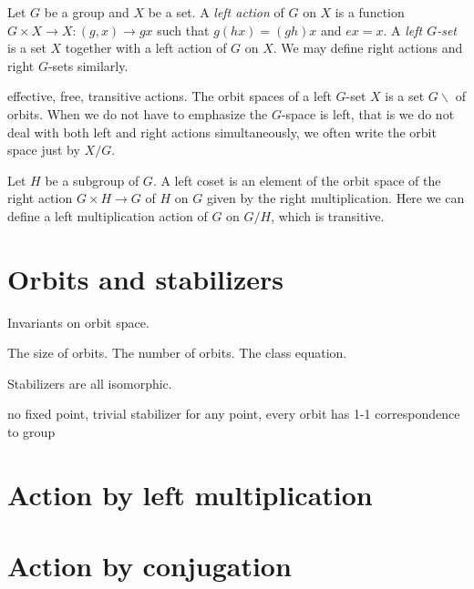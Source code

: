 \documentclass{../../large}
\begin{document}
Let $G$ be a group and $X$ be a set.
A \emph{left action} of $G$ on $X$ is a function $G\times X\to X:(g,x)\to gx$ such that $g(hx)=(gh)x$ and $ex=x$.
A \emph{left $G$-set} is a set $X$ together with a left action of $G$ on $X$.
We may define right actions and right $G$-sets similarly.

effective, free, transitive actions.
The orbit spaces of a left $G$-set $X$ is a set $G\backslash$ of orbits.
When we do not have to emphasize the $G$-space is left, that is we do not deal with both left and right actions simultaneously, we often write the orbit space just by $X/G$.

Let $H$ be a subgroup of $G$.
A left coset is an element of the orbit space of the right action $G\times H\to G$ of $H$ on $G$ given by the right multiplication.
Here we can define a left multiplication action of $G$ on $G/H$, which is transitive.

\section{Orbits and stabilizers}
Invariants on orbit space.

\begin{prb}
The size of orbits.
The number of orbits.
The class equation.
\end{prb}


\begin{prb}
\begin{parts}
\item Stabilizers are all isomorphic.
\end{parts}
\end{prb}

\begin{prb}
no fixed point,
trivial stabilizer for any point,
every orbit has 1-1 correspondence to group
\end{prb}

\section{Action by left multiplication}

\section{Action by conjugation}
\begin{prb}
\end{prb}
\end{document}
